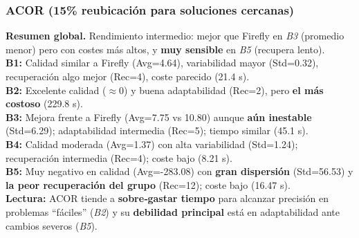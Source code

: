\documentclass[10pt,twocolumn]{article}
\begin{document}
\begin{table}[H]
\centering
\caption{ACOR (15\% reubicación de población): resultados promedios por benchmark.}
\label{tab:acor}
\scriptsize
{}
\end{table}

\subsubsection*{ACOR (15\% reubicación para soluciones cercanas)}
\textbf{Resumen global.} Rendimiento intermedio: mejor que Firefly en \textit{B3} (promedio menor) pero con costes más altos, y \textbf{muy sensible} en \textit{B5} (recupera lento). \\
\textbf{B1:} Calidad similar a Firefly (Avg=4.64), variabilidad mayor (Std=0.32), recuperación algo mejor (Rec=4), coste parecido (21.4 s). \\
\textbf{B2:} Excelente calidad ($\approx 0$) y buena adaptabilidad (Rec=2), pero \textbf{el más costoso} (229.8 s). \\
\textbf{B3:} Mejora frente a Firefly (Avg=7.75 vs 10.80) aunque \textbf{aún inestable} (Std=6.29); adaptabilidad intermedia (Rec=5); tiempo similar (45.1 s). \\
\textbf{B4:} Calidad moderada (Avg=1.37) con alta variabilidad (Std=1.24); recuperación intermedia (Rec=4); coste bajo (8.21 s). \\
\textbf{B5:} Muy negativo en calidad (Avg=-283.08) con \textbf{gran dispersión} (Std=56.53) y \textbf{la peor recuperación del grupo} (Rec=12); coste bajo (16.47 s). \\
\textbf{Lectura:} ACOR tiende a \textbf{sobre‐gastar tiempo} para alcanzar precisión en problemas “fáciles” (\textit{B2}) y su \textbf{debilidad principal} está en adaptabilidad ante cambios severos (\textit{B5}).
\end{document}
